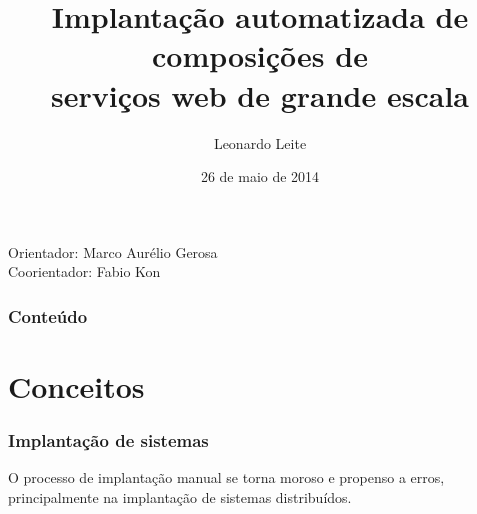 \documentclass{beamer}
\title[Defesa mestrado]{Implantação automatizada de composições de \\ serviços web de grande escala} %
\author{Leonardo Leite} %
\institute[IME - USP] %
{
IME - USP \\ %
\medskip
}
\date{26 de maio de 2014} %
\newcommand\frase[1]{\begin{center}\large#1\end{center}}
\begin{document}
\begin{frame}
\titlepage %
\begin{center}
{\scriptsize
Orientador: Marco Aurélio Gerosa \\
Coorientador: Fabio Kon
}
\end{center}
\end{frame}

\begin{frame}
\frametitle{Conteúdo} %
\tableofcontents %
\end{frame}


\section{Conceitos} %




\begin{frame}
\frametitle{Implantação de sistemas}

\frase{O processo de implantação manual se torna moroso e propenso a erros,
principalmente na implantação de sistemas distribuídos.}

\end{frame}
\end{document}
